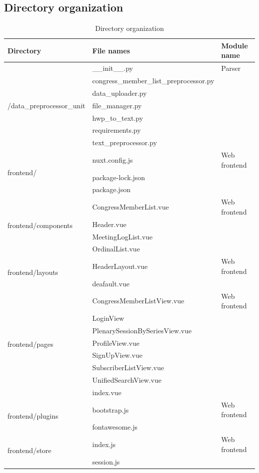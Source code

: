 \documentclass[conference]{IEEEtran}
\begin{document}
\vspace{30mm}
\subsection{Directory organization}

  \begin{table}[htbp]
  \renewcommand{\arraystretch}{1.5}
\caption{Directory organization}
\begin{center}
\begin{tabular}{|p{3cm}|p{4.7cm}|p{1.7cm}|}
\hline
\textbf{Directory} & \textbf{File names } &\textbf{Module name} \\
\hline
\multirow{7}{*}{/data\_preprocessor\_unit}& \_\_init\_\_.py&Parser \\
& congress\_member\_list\_preprocessor.py&\\
& data\_uploader.py &\\
& file\_manager.py &\\
& hwp\_to\_text.py & \\
& requirements.py & \\
&text\_preprocessor.py& \\

\hline
\multirow{3}{*}{frontend/} & nuxt.config.js&Web frontend \\
& package-lock.json & \\
& package.json & \\

\hline
\multirow{4}{*}{frontend/components}& CongressMemberList.vue& Web frontend\\
& Header.vue&\\
& MeetingLogList.vue & \\
& OrdinalList.vue & \\

\hline
\multirow{2}{*}{frontend/layouts} & HeaderLayout.vue& Web frontend\\
& deafault.vue &\\

\hline
\multirow{8}{*}{frontend/pages} & CongressMemberListView.vue & Web frontend\\
& LoginView & \\
& PlenarySessionBySeriesView.vue & \\
& ProfileView.vue & \\
& SignUpView.vue & \\
& SubscriberListView.vue & \\
& UnifiedSearchView.vue & \\
& index.vue & \\
\hline
\multirow{2}{*}{frontend/plugins} & bootstrap.js & Web frontend\\
& fontawesome.js & \\
\hline
\multirow{2}{*}{frontend/store} & index.js & Web frontend \\
& session.js & \\
\hline
\end{tabular}
\label{tab1}
\end{center}
\end{table}
\end{document}
